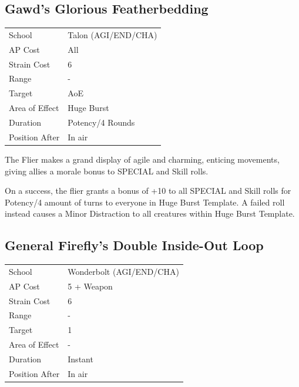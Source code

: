 \documentclass[11pt,a4paper,twocolumn]{book}
\begin{document}
\subsection*{Gawd's Glorious Featherbedding}
{
	\begin{tabu} to 75mm{| X[l,4] | X[l,7] |}
		\hline
		School 			& Talon (AGI/END/CHA)			\\
        AP Cost	      	& All 				\\
        Strain Cost     & 6 				\\
        Range     		& - 				\\
        Target      	& AoE 				\\
        Area of Effect  & Huge Burst 	 	\\
        Duration     	& Potency/4 Rounds 	\\
		Position After  & In air 			\\ \hline
	\end{tabu}
		
}

\medskip

The Flier makes a grand display of agile and charming, enticing movements, giving allies a morale bonus to SPECIAL and Skill rolls.

On a success, the flier grants a bonus of +10 to all SPECIAL and Skill rolls for Potency/4 amount of turns to everyone in Huge Burst Template. A failed roll instead causes a Minor Distraction to all creatures within Huge Burst Template.



\subsection*{General Firefly's Double Inside-Out Loop}
{
	\begin{tabu} to 75mm{| X[l,4] | X[l,7] |}
		\hline
		School 			& Wonderbolt (AGI/END/CHA) 		\\
        AP Cost	      	& 5 + Weapon 		\\
        Strain Cost     & 6 				\\
        Range     		& - 				\\
        Target      	& 1 				\\
        Area of Effect  & - 	 			\\
        Duration     	& Instant 	 		\\
		Position After  & In air 			\\ \hline
	\end{tabu}
		
}
\end{document}
